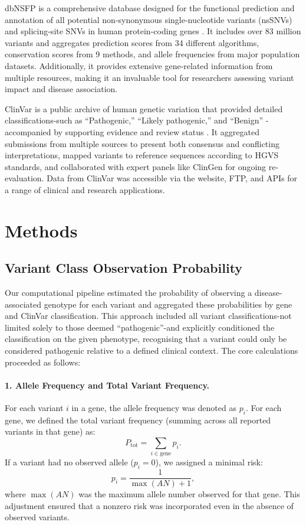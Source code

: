 dbNSFP is a comprehensive database designed for the functional prediction and annotation of all potential non-synonymous single-nucleotide variants (nsSNVs) and splicing-site SNVs in human protein-coding genes \cite{liu_dbnsfp_2020}. It includes over 83 million variants and aggregates prediction scores from 34 different algorithms, conservation scores from 9 methods, and allele frequencies from major population datasets. Additionally, it provides extensive gene-related information from multiple resources, making it an invaluable tool for researchers assessing variant impact and disease association.

ClinVar is a public archive of human genetic variation that provided detailed classifications-such as ``Pathogenic,'' ``Likely pathogenic,'' and ``Benign'' -accompanied by supporting evidence and review status \cite{landrum_clinvar_2018}. It aggregated submissions from multiple sources to present both consensus and conflicting interpretations, mapped variants to reference sequences according to HGVS standards, and collaborated with expert panels like ClinGen for ongoing re-evaluation. Data from ClinVar was accessible via the website, FTP, and APIs for a range of clinical and research applications.




\section{Methods}
\subsection{Variant Class Observation Probability}

Our computational pipeline estimated the probability of observing a disease-associated genotype for each variant and aggregated these probabilities by gene and ClinVar classification. This approach included all variant classifications-not limited solely to those deemed “pathogenic”-and explicitly conditioned the classification on the given phenotype, recognising that a variant could only be considered pathogenic relative to a defined clinical context. The core calculations proceeded as follows:

\paragraph{1. Allele Frequency and Total Variant Frequency.}
For each variant \(i\) in a gene, the allele frequency was denoted as \(p_i\). For each gene, we defined the total variant frequency (summing across all reported variants in that gene) as:
\[
P_{\text{tot}} = \sum_{i \in \text{gene}} p_i.
\]
If a variant had no observed allele (\(p_i = 0\)), we assigned a minimal risk:
\[
p_i = \frac{1}{\max(AN) + 1},
\]
where \(\max(AN)\) was the maximum allele number observed for that gene. This adjustment ensured that a nonzero risk was incorporated even in the absence of observed variants.
